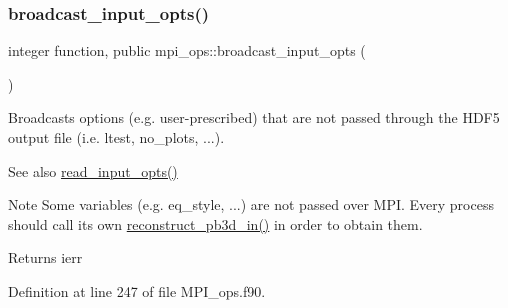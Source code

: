 \subsubsection{\texorpdfstring{broadcast\+\_\+input\+\_\+opts()}{broadcast\_input\_opts()}}
{\footnotesize\ttfamily integer function, public mpi\+\_\+ops\+::broadcast\+\_\+input\+\_\+opts (\begin{DoxyParamCaption}{ }\end{DoxyParamCaption})}



Broadcasts options (e.\+g. user-\/prescribed) that are not passed through the H\+D\+F5 output file (i.\+e. {\ttfamily ltest}, {\ttfamily no\+\_\+plots}, ...). 

\begin{DoxySeeAlso}{See also}
\hyperlink{namespaceinput__ops_a434acca4f59f9dc1d91e04f846133684}{read\+\_\+input\+\_\+opts()}
\end{DoxySeeAlso}
\begin{DoxyNote}{Note}
Some variables (e.\+g. {\ttfamily eq\+\_\+style}, ...) are not passed over M\+PI. Every process should call its own \hyperlink{namespacepb3d__ops_ad1481747b9b9832f816d4bf1dd2d6737}{reconstruct\+\_\+pb3d\+\_\+in()} in order to obtain them.
\end{DoxyNote}
\begin{DoxyReturn}{Returns}
ierr 
\end{DoxyReturn}


Definition at line 247 of file M\+P\+I\+\_\+ops.\+f90.

